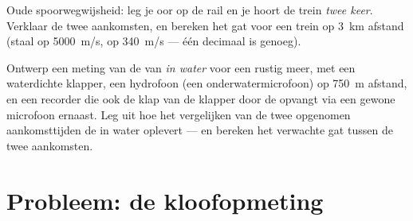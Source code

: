 \begin{exercise}[$\star\star$]\label{exo:g7:sound-production:11}
Oude spoorwegwijsheid: leg je oor op de rail en je hoort de trein
\emph{twee keer}. Verklaar de twee aankomsten, en bereken het gat voor
een trein op \qty{3}{km} afstand (staal op \qty{5000}{m/s},
 op \qty{340}{m/s} --- één decimaal is genoeg).
\end{exercise}

\begin{exercise}[$\star\star\star$]\label{exo:g7:sound-production:12}
Ontwerp een meting van de  van  \emph{in water}
voor een rustig meer, met een waterdichte klapper, een hydrofoon (een
onderwatermicrofoon) op \qty{750}{m} afstand, en een recorder die ook
de klap van de klapper door de  opvangt via een gewone microfoon
ernaast. Leg uit hoe het vergelijken van de twee opgenomen
aankomsttijden de  in water oplevert --- en bereken het
verwachte gat tussen de twee aankomsten.
\end{exercise}

\section{Probleem: de kloofopmeting}

